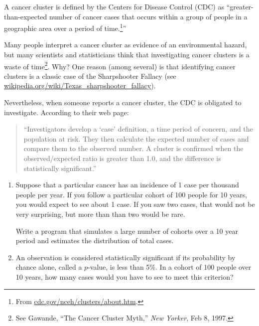 \documentclass[12pt]{book}
\begin{document}
\begin{ex}


A cancer cluster is defined by the Centers for Disease Control (CDC)
as ``greater-than-expected number of cancer cases that occurs within a
group of people in a geographic area over a period of
time.\footnote{From \url{cdc.gov/nceh/clusters/about.htm}.}''


Many people interpret a cancer cluster as evidence of an environmental
hazard, but many scientists and statisticians think that investigating
cancer clusters is a waste of time\footnote{See Gawande, ``The Cancer
  Cluster Myth,'' {\em New Yorker}, Feb 8, 1997.}.  Why?  One reason
(among several) is that identifying cancer clusters is a classic case
of the Sharpshooter Fallacy (see
\url{wikipedia.org/wiki/Texas_sharpshooter_fallacy}).


Nevertheless, when someone reports a cancer cluster, the CDC is
obligated to investigate.  According to their web page:

\begin{quote}

``Investigators develop a `case' definition, a time period of concern,
  and the population at risk. They then calculate the expected number
  of cases and compare them to the observed number. A cluster is
  confirmed when the observed/expected ratio is greater than 1.0, and
  the difference is statistically significant.''

\end{quote}

\begin{enumerate}


\item Suppose that a particular cancer has an incidence of 1 case per
  thousand people per year.  If you follow a particular cohort of 100
  people for 10 years, you would expect to see about 1 case.  If you
  saw two cases, that would not be very surprising, but more than than
  two would be rare.

Write a program that simulates a large number of cohorts over
a 10 year period and estimates the distribution of total cases.

\item An observation is considered statistically significant if its
  probability by chance alone, called a $p$-value, is less than 5\%.
  In a cohort of 100 people over 10 years, how many cases would you
  have to see to meet this criterion?


\end{enumerate}
\end{ex}
\end{document}
